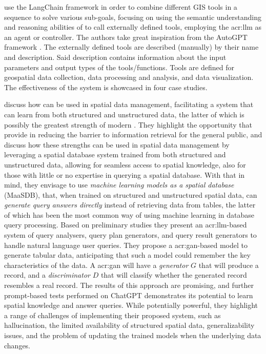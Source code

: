 \cite{zhangGeoGPTUnderstandingProcessing2023} use the LangChain framework in order to combine different GIS tools in a sequence to solve various sub-goals, focusing on using the semantic understanding and reasoning abilities of  to call externally defined tools, employing the \acrshort{acr:llm} as an agent or controller. The authors take great inspiration from the AutoGPT framework \citep{richardAutoGPTHeartOpensource2023}. The externally defined tools are described (manually) by their name and description. Said description contains information about the input parameters and output types of the tools/functions. Tools are defined for geospatial data collection, data processing and analysis, and data visualization. The effectiveness of the system is showcased in four case studies.

\cite{qiMaaSDBSpatialDatabases2023} discuss how  can be used in spatial data management, facilitating a system that can learn from both structured and unstructured data, the latter of which is possibly the greatest strength of modern . They highlight the opportunity that  provide in reducing the barrier to information retrieval for the general public, and discuss how these strengths can be used in spatial data management by leveraging a spatial database system trained from both structured and unstructured data, allowing for seamless access to spatial knowledge, also for those with little or no expertise in querying a spatial database. With that in mind, they envisage to use \textit{machine learning models as a spatial database} (MaaSDB), that, when trained on structured and unstructured spatial data, can \textit{generate query answers directly} instead of retrieving data from tables, the latter of which has been the most common way of using machine learning in database query processing. Based on preliminary studies they present an \acrshort{acr:llm}-based system of query analysers, query plan generators, and query result generators to handle natural language user queries. They propose a \gls{acr:gan}-based model to generate tabular data, anticipating that such a model could remember the key characteristics of the data. A \gls{acr:gan} will have a \textit{generator} $G$ that will produce a record, and a \textit{discriminator} $D$ that will classify whether the generated record resembles a real record. The results of this approach are promising, and further prompt-based tests performed on ChatGPT demonstrates its potential to learn spatial knowledge and answer queries. While potentially powerful, they highlight a range of challenges of implementing their proposed system, such as hallucination, the limited availability of structured spatial data, generalizability issues, and the problem of updating the trained models when the underlying data changes.



